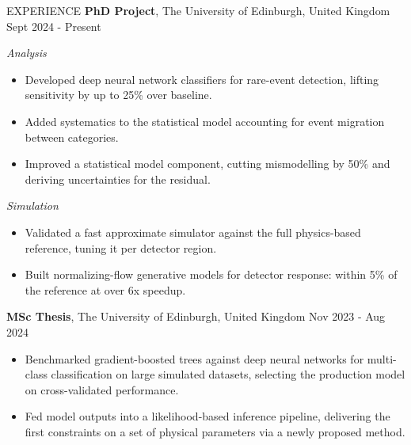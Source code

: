 \documentclass{resume} %
\begin{document}
        \begin{rSection}{EXPERIENCE}
                \textbf{PhD Project}, The University of Edinburgh, United Kingdom \hfill Sept 2024 - Present\\
                \vspace{-1.2em}

                \textit{Analysis}
                \vspace{-0.6em}
                \begin{itemize}
                        \itemsep -2pt {}
                        \item Developed deep neural network classifiers for rare-event detection, lifting sensitivity by up to 25\% over baseline.
                        \item Added systematics to the statistical model accounting for event migration between categories.
                        \item Improved a statistical model component, cutting mismodelling by 50\% and deriving uncertainties for the residual.
                \end{itemize}
                \vspace{-0.4em}

                \textit{Simulation}
                \vspace{-0.6em}
                \begin{itemize}
                        \itemsep -2pt {}
                        \item Validated a fast approximate simulator against the full physics-based reference, tuning it per detector region.
                        \item Built normalizing-flow generative models for detector response: within 5\% of the reference at over 6x speedup.
                \end{itemize}

                \textbf{MSc Thesis}, The University of Edinburgh, United Kingdom \hfill Nov 2023 - Aug 2024\\
                \vspace{-1.5em}
                \begin{itemize}
                        \itemsep -2pt {}
                        \item Benchmarked gradient-boosted trees against deep neural networks for multi-class classification on large simulated datasets, selecting the production model on cross-validated performance.
                        \item Fed model outputs into a likelihood-based inference pipeline, delivering the first constraints on a set of physical parameters via a newly proposed method.
                \end{itemize}


\end{rSection}
\end{document}

